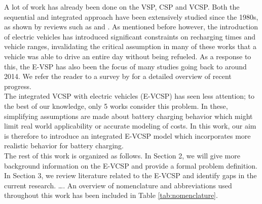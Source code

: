 \documentclass[]{article}
\begin{document}
A lot of work has already been done on the VSP, CSP and VCSP. Both the sequential and integrated approach have been extensively studied since the 1980s, as shown by reviews such as \citet{Ibarra-Rojas2015} and \citet{Ge2024}. As mentioned before however, the introduction of electric vehicles has introduced significant constraints on recharging times and vehicle ranges, invalidating the critical assumption in many of these works that a vehicle was able to drive an entire day without being refueled. As a response to this, the E-VSP has also been the focus of many studies going back to around 2014. We refer the reader to a survey by \citet{Perumal2022LitRev} for a detailed overview of recent progress. \\
The integrated VCSP with electric vehicles (E-VCSP) has seen less attention; to the best of our knowledge, only 5 works consider this problem. In these, simplifying assumptions are made about battery charging behavior which might limit real world applicability or accurate modeling of costs. In this work, our aim is therefore to introduce an integrated E-VCSP model which incorporates more realistic behavior for battery charging. \\
The rest of this work is organized as follows. In Section 2, we will give more background information on the E-VCSP and provide a formal problem definition. In Section 3, we review literature related to the E-VCSP and identify gaps in the current research. \dots. An overview of nomenclature and abbreviations used throughout this work has been included in Table \ref{tab:nomenclature}.
\end{document}

